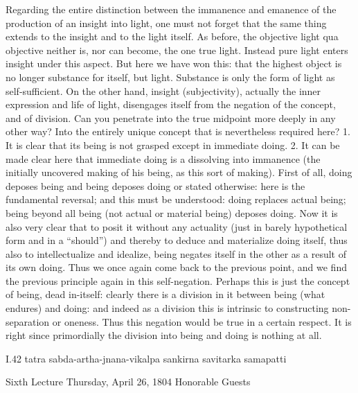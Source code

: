 Regarding the entire distinction
between the immanence and emanence
of the production of an insight into light,
one must not forget that the same thing
extends to the insight and to the light itself.
As before, the objective light qua objective
neither is, nor can become, the one true light.
Instead pure light enters insight under this aspect.
But here we have won this:
that the highest object is no longer
substance for itself, but light.
Substance is only the form of light as self-sufficient.
On the other hand, insight (subjectivity),
actually the inner expression and life of light,
disengages itself from the negation of
the concept, and of division.
Can you penetrate into the true midpoint
more deeply in any other way?
Into the entirely unique concept
that is nevertheless required here?
1. It is clear that its being is not grasped
except in immediate doing.
2. It can be made clear here that immediate doing is
a dissolving into immanence
(the initially uncovered making of his being,
as this sort of making).
First of all, doing deposes being
and being deposes doing
or stated otherwise:
here is the fundamental reversal;
and this must be understood:
doing replaces actual being;
being beyond all being
(not actual or material being)
deposes doing.
Now it is also very clear that
to posit it without any actuality
(just in barely hypothetical form and in a “should”)
and thereby to deduce and materialize doing itself,
thus also to intellectualize and idealize,
being negates itself in the other
as a result of its own doing.
Thus we once again come back to the previous point,
and we find the previous principle again in this self-negation.
Perhaps this is just the concept of being, dead in-itself:
clearly there is a division in it
between being (what endures) and doing:
and indeed as a division this is intrinsic
to constructing non-separation or oneness.
Thus this negation would be true in a certain respect.
It is right since primordially the division
into being and doing is nothing at all.

I.42
tatra sabda-artha-jnana-vikalpa sankirna savitarka samapatti

Sixth Lecture
Thursday, April 26, 1804
Honorable Guests

